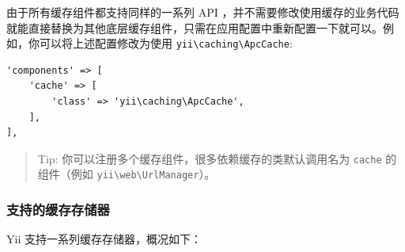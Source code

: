 由于所有缓存组件都支持同样的一系列 API ，并不需要修改使用缓存的业务代码就能直接替换为其他底层缓存组件，只需在应用配置中重新配置一下就可以。例如，你可以将上述配置修改为使用 \texttt{yii{\allowbreak{}\textbackslash}caching{\allowbreak{}\textbackslash}ApcCache}:

\lstset{language=php}\begin{lstlisting}
'components' => [
    'cache' => [
        'class' => 'yii\caching\ApcCache',
    ],
],
\end{lstlisting}
\begin{quote}Tip: 你可以注册多个缓存组件，很多依赖缓存的类默认调用名为 \lstinline|cache| 的组件（例如 \texttt{yii{\allowbreak{}\textbackslash}web{\allowbreak{}\textbackslash}UrlManager}）。

\end{quote}
\subsubsection{支持的缓存存储器 \label{caching-data.md::supported-cache-storage}}
Yii 支持一系列缓存存储器，概况如下：

